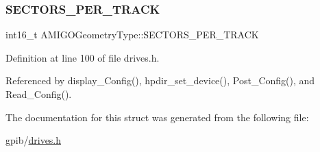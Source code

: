 \subsubsection{\texorpdfstring{S\+E\+C\+T\+O\+R\+S\+\_\+\+P\+E\+R\+\_\+\+T\+R\+A\+CK}{SECTORS\_PER\_TRACK}}
{\footnotesize\ttfamily int16\+\_\+t A\+M\+I\+G\+O\+Geometry\+Type\+::\+S\+E\+C\+T\+O\+R\+S\+\_\+\+P\+E\+R\+\_\+\+T\+R\+A\+CK}



Definition at line 100 of file drives.\+h.



Referenced by display\+\_\+\+Config(), hpdir\+\_\+set\+\_\+device(), Post\+\_\+\+Config(), and Read\+\_\+\+Config().



The documentation for this struct was generated from the following file\+:\begin{DoxyCompactItemize}
\item 
gpib/\hyperlink{drives_8h}{drives.\+h}\end{DoxyCompactItemize}
